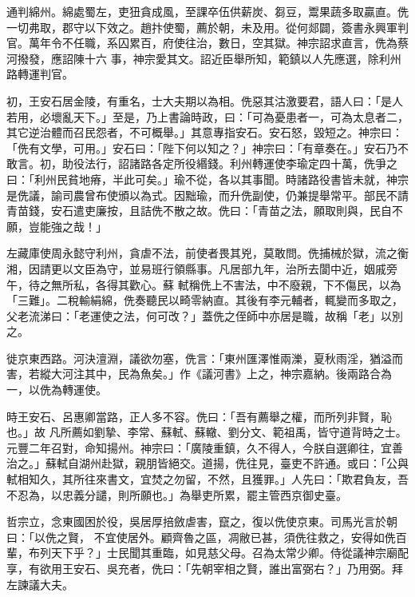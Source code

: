 \begin{pinyinscope}
 通判綿州。綿處蜀左，吏狃貪成風，至課卒伍供薪炭、芻豆，鬻果蔬多取贏直。侁一切弗取，郡守以下效之。趙抃使蜀，薦於朝，未及用。從何郯闢，簽書永興軍判官。萬年令不任職，系囚累百，府使往治，數日，空其獄。神宗詔求直言，侁為蔡河撥發，應詔陳十六
 事，神宗愛其文。詔近臣舉所知，範鎮以人先應選，除利州路轉運判官。



 初，王安石居金陵，有重名，士大夫期以為相。侁惡其沽激要君，語人曰：「是人若用，必壞亂天下。」至是，乃上書論時政，曰：「可為憂患者一，可為太息者二，其它逆治體而召民怨者，不可概舉。」其意專指安石。安石怒，毀短之。神宗曰：「侁有文學，可用。」安石曰：「陛下何以知之？」神宗曰：「有章奏在。」安石乃不敢言。初，助役法行，詔諸路各定所役緡錢。利州轉運使李瑜定四十萬，侁爭之
 曰：「利州民貧地瘠，半此可矣。」瑜不從，各以其事聞。時諸路役書皆未就，神宗是侁議，諭司農曾布使頒以為式。因黜瑜，而升侁副使，仍兼提舉常平。部民不請青苗錢，安石遣吏廉按，且詰侁不散之故。侁曰：「青苗之法，願取則與，民自不願，豈能強之哉！」



 左藏庫使周永懿守利州，貪虐不法，前使者畏其兇，莫敢問。侁捕械於獄，流之衡湘，因請更以文臣為守，並易班行領縣事。凡居部九年，治所去閬中近，姻戚旁午，待之無所私，各得其歡心。蘇
 軾稱侁上不害法，中不廢親，下不傷民，以為「三難」。二稅輸絹綿，侁奏聽民以畸零納直。其後有李元輔者，輒變而多取之，父老流涕曰：「老運使之法，何可改？」蓋侁之侄師中亦居是職，故稱「老」以別之。



 徙京東西路。河決澶淵，議欲勿塞，侁言：「東州匯澤惟兩濼，夏秋雨淫，猶溢而害，若縱大河注其中，民為魚矣。」作《議河書》上之，神宗嘉納。後兩路合為一，以侁為轉運使。



 時王安石、呂惠卿當路，正人多不容。侁曰：「吾有薦舉之權，而所列非賢，恥也。」故
 凡所薦如劉摯、李常、蘇軾、蘇轍、劉分文、範祖禹，皆守道背時之士。元豐二年召對，命知揚州。神宗曰：「廣陵重鎮，久不得人，今朕自選卿往，宜善治之。」蘇軾自湖州赴獄，親朋皆絕交。道揚，侁往見，臺吏不許通。或曰：「公與軾相知久，其所往來書文，宜焚之勿留，不然，且獲罪。」人先曰：「欺君負友，吾不忍為，以忠義分譴，則所願也。」為舉吏所累，罷主管西京御史臺。



 哲宗立，念東國困於役，吳居厚掊斂虐害，竄之，復以侁使京東。司馬光言於朝曰：「以侁之賢，
 不宜使居外。顧齊魯之區，凋敝已甚，須侁往救之，安得如侁百輩，布列天下乎？」士民聞其重臨，如見慈父母。召為太常少卿。侍從議神宗廟配享，有欲用王安石、吳充者，侁曰：「先朝宰相之賢，誰出富弼右？」乃用弼。拜左諫議大夫。




\end{pinyinscope}

